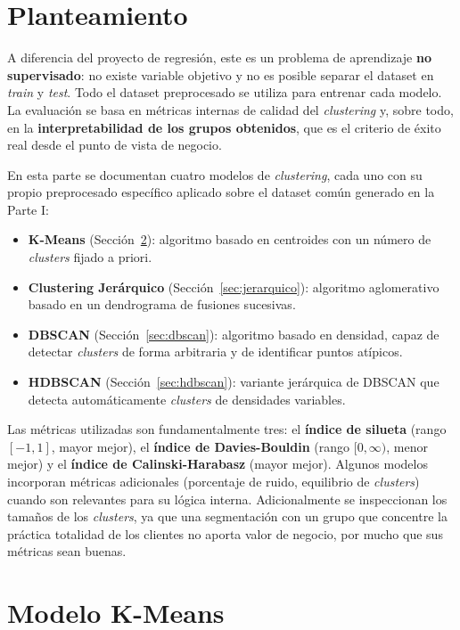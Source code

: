 \documentclass[11pt,a4paper]{article}
\begin{document}
\section{Planteamiento}

A diferencia del proyecto de regresión, este es un problema de aprendizaje \textbf{no supervisado}: no existe variable objetivo y no es posible separar el dataset en \textit{train} y \textit{test}. Todo el dataset preprocesado se utiliza para entrenar cada modelo. La evaluación se basa en métricas internas de calidad del \textit{clustering} y, sobre todo, en la \textbf{interpretabilidad de los grupos obtenidos}, que es el criterio de éxito real desde el punto de vista de negocio.

En esta parte se documentan cuatro modelos de \textit{clustering}, cada uno con su propio preprocesado específico aplicado sobre el dataset común generado en la Parte I:

\begin{itemize}
    \item \textbf{K-Means} (Sección~\ref{sec:kmeans}): algoritmo basado en centroides con un número de \textit{clusters} fijado a priori.
    \item \textbf{Clustering Jerárquico} (Sección~\ref{sec:jerarquico}): algoritmo aglomerativo basado en un dendrograma de fusiones sucesivas.
    \item \textbf{DBSCAN} (Sección~\ref{sec:dbscan}): algoritmo basado en densidad, capaz de detectar \textit{clusters} de forma arbitraria y de identificar puntos atípicos.
    \item \textbf{HDBSCAN} (Sección~\ref{sec:hdbscan}): variante jerárquica de DBSCAN que detecta automáticamente \textit{clusters} de densidades variables.
\end{itemize}

Las métricas utilizadas son fundamentalmente tres: el \textbf{índice de silueta} (rango $[-1, 1]$, mayor mejor), el \textbf{índice de Davies-Bouldin} (rango $[0, \infty)$, menor mejor) y el \textbf{índice de Calinski-Harabasz} (mayor mejor). Algunos modelos incorporan métricas adicionales (porcentaje de ruido, equilibrio de \textit{clusters}) cuando son relevantes para su lógica interna. Adicionalmente se inspeccionan los tamaños de los \textit{clusters}, ya que una segmentación con un grupo que concentre la práctica totalidad de los clientes no aporta valor de negocio, por mucho que sus métricas sean buenas.

\section{Modelo K-Means}
\label{sec:kmeans}
\end{document}
